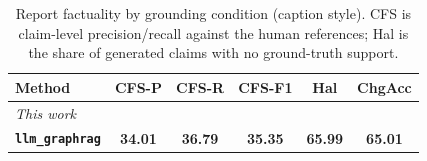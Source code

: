 \begin{table}[t]
\centering
\caption{Report factuality by grounding condition (caption style). CFS is claim-level precision/recall against the human references; Hal is the share of generated claims with no ground-truth support.}
\label{tab:factuality_caption}
\setlength{\tabcolsep}{3pt}
\begin{tabular}{lccccc}
\toprule
Method & CFS-P & CFS-R & CFS-F1 & Hal & ChgAcc \\
\midrule
\multicolumn{6}{l}{\emph{This work}} \\
\textbf{\texttt{llm\_graphrag}} & \textbf{34.01} & \textbf{36.79} & \textbf{35.35} & \textbf{65.99} & \textbf{65.01} \\
\bottomrule
\end{tabular}
\end{table}

